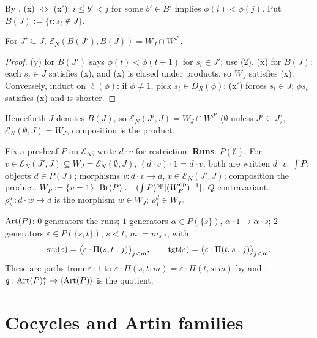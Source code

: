 \documentclass[11pt]{article}
\newcommand{\EN}{\mathcal{E}_N}
\newcommand{\altw}[3]{\Pi(#1,#2:#3)}
\begin{document}
By \cite[Def.~6.11]{PZ}, (x) $\iff$ (x$'$): $i \le b' < j$ for some $b' \in B'$ implies $\phi(i) <
\phi(j)$. Put $B(J) := \{t : s_t \notin J\}$.

\begin{lemma}\label{lem:EN}
  For $J' \subseteq J$, $\EN(B(J'),B(J)) = W_J \cap W^{J'}$.
\end{lemma}
\begin{proof}
  (y) for $B(J')$ says $\phi(t) < \phi(t+1)$ for $s_t \in J'$; use (2).
  (x) for $B(J)$: each $s_t \in J$ satisfies (x), and (x) is closed under products, so $W_J$ satisfies
  (x). Conversely, induct on $\ell(\phi)$: if $\phi \neq 1$,
  pick $s_t \in D_R(\phi)$; (x$'$) forces $s_t \in J$; $\phi s_t$ satisfies (x) and is shorter.
\end{proof}

Henceforth $J$ denotes $B(J)$, so $\EN(J',J) = W_J \cap W^{J'}$ ($\emptyset$ unless $J' \subseteq J$),
$\EN(\emptyset,J) = W_J$, composition is the product.

Fix a presheaf $P$ on $\EN$; write $d\cdot v$ for restriction. \textbf{Runs}: $P(\emptyset)$. For $v
\in \EN(J',J) \subseteq W_J = \EN(\emptyset,J)$, $(d\cdot v)\cdot 1 = d\cdot v$; both are written
$d\cdot v$. $\int P$: objects $d \in P(J)$; morphisms $v : d\cdot v \to d$, $v \in \EN(J',J)$;
composition the product. $W_P := \{v = 1\}$. $\operatorname{Br}(P) := (\int P)^{\mathrm{op}}[(W_P^{\mathrm{op}})^{-1}]$, $Q$ contravariant.
$\rho^d_w : d\cdot w \to d$ is the morphism $w \in W_J$; $\rho^d_1 \in W_P$.

\begin{definition}\label{def:art}
  $\operatorname{Art}(P)$: $0$-generators the runs; $1$-generators $\alpha \in P(\{s\})$, $\alpha\cdot1 \to
  \alpha\cdot s$; $2$-generators $\varepsilon \in P(\{s,t\})$, $s < t$, $m := m_{s,t}$, with
  \[
    \src(\varepsilon) = \bigl(\varepsilon\cdot\altw stj\bigr)_{j<m}, \qquad
    \tgt(\varepsilon) = \bigl(\varepsilon\cdot\altw tsj\bigr)_{j<m}.
  \]
  These are paths from $\varepsilon\cdot 1$ to $\varepsilon\cdot\altw stm = \varepsilon\cdot\altw tsm$
  by  and \cite[(1.29)]{BB}. $q : \operatorname{Art}(P)_1^* \to \left\langle \operatorname{Art}(P) \right\rangle$ is the quotient.
\end{definition}

\section{Cocycles and Artin families}
\end{document}
